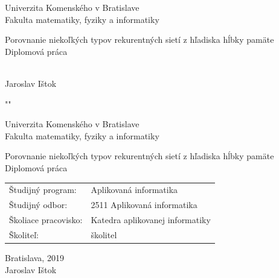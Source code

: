 \documentclass[12pt, oneside]{book}
\def\mfrok{2019}
\def\mfnazov{Porovnanie niekoľkých typov rekurentných sietí z hľadiska hĺbky pamäte}
\def\mftyp{Diplomová práca}
\def\mfautor{Jaroslav Ištok}
\def\mfskolitel{školitel}
\def\mfmiesto{Bratislava, \mfrok}
\def\mfodbor{2511  Aplikovaná informatika}
\def\program{ Aplikovaná informatika }
\def\mfpracovisko{ Katedra aplikovanej informatiky }
\begin{document}
     

\thispagestyle{empty}

\begin{center}
\sc\large
 Univerzita Komenského v Bratislave\\
 Fakulta matematiky, fyziky a informatiky
\vfill

{
\LARGE\mfnazov}\\
\mftyp

\end{center}

\vfill

{\sc\large 
\noindent \mfrok\\
\mfautor
}

\eject %


\thispagestyle{empty}
\noindent
""
\begin{center}
\sc  
\large
 Univerzita Komenského v Bratislave\\
 Fakulta matematiky, fyziky a informatiky

\vfill

{\LARGE\mfnazov}\\
\mftyp
\end{center}

\vfill

\noindent
\begin{tabular}{ll}
Študijný program: & \program \\
Študijný odbor: & \mfodbor \\
Školiace pracovisko: & \mfpracovisko \\
Školiteľ: & \mfskolitel \\
\end{tabular}

\vfill


\noindent \mfmiesto\\
\mfautor

\eject %




\end{document}
